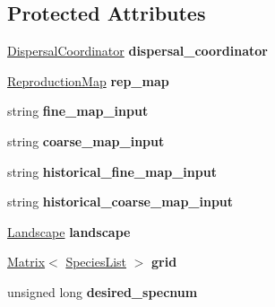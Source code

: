 \subsection*{Protected Attributes}
\begin{DoxyCompactItemize}
\item 
\hyperlink{class_dispersal_coordinator}{Dispersal\+Coordinator} {\bfseries dispersal\+\_\+coordinator}\hypertarget{class_spatial_tree_ad238e987bbf1cf2110bd6c3b980de3e4}{}\label{class_spatial_tree_ad238e987bbf1cf2110bd6c3b980de3e4}

\item 
\hyperlink{class_reproduction_map}{Reproduction\+Map} {\bfseries rep\+\_\+map}\hypertarget{class_spatial_tree_aee26e469bc42c208feb98f6320bd9d0c}{}\label{class_spatial_tree_aee26e469bc42c208feb98f6320bd9d0c}

\item 
string {\bfseries fine\+\_\+map\+\_\+input}\hypertarget{class_spatial_tree_a44fdea35be7d4496248ee27c1457ad6a}{}\label{class_spatial_tree_a44fdea35be7d4496248ee27c1457ad6a}

\item 
string {\bfseries coarse\+\_\+map\+\_\+input}\hypertarget{class_spatial_tree_a464b674dbf6f2968497f698ad9a16433}{}\label{class_spatial_tree_a464b674dbf6f2968497f698ad9a16433}

\item 
string {\bfseries historical\+\_\+fine\+\_\+map\+\_\+input}\hypertarget{class_spatial_tree_ac49970522839ed06459949caca57fa1d}{}\label{class_spatial_tree_ac49970522839ed06459949caca57fa1d}

\item 
string {\bfseries historical\+\_\+coarse\+\_\+map\+\_\+input}\hypertarget{class_spatial_tree_a54279132ba3e8bc3455488bb3b16e8f8}{}\label{class_spatial_tree_a54279132ba3e8bc3455488bb3b16e8f8}

\item 
\hyperlink{class_landscape}{Landscape} {\bfseries landscape}\hypertarget{class_spatial_tree_abce7e0ce105b3f401b8dce770a20f8a2}{}\label{class_spatial_tree_abce7e0ce105b3f401b8dce770a20f8a2}

\item 
\hyperlink{class_matrix}{Matrix}$<$ \hyperlink{class_species_list}{Species\+List} $>$ {\bfseries grid}\hypertarget{class_spatial_tree_a199167b149b25c506fdaeb660d595658}{}\label{class_spatial_tree_a199167b149b25c506fdaeb660d595658}

\item 
unsigned long {\bfseries desired\+\_\+specnum}\hypertarget{class_spatial_tree_a694c7eb6c70687ea87e49066a8957877}{}\label{class_spatial_tree_a694c7eb6c70687ea87e49066a8957877}


\end{DoxyCompactItemize}
